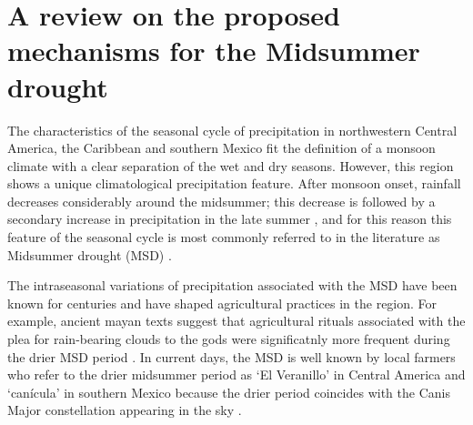 
\section{A review on the proposed mechanisms for the Midsummer drought}\label{sq:litmsd}


The characteristics of the seasonal cycle of precipitation in northwestern Central America, the Caribbean and southern Mexico fit the definition of a monsoon climate \citep{wang2017} with a clear separation of the wet and dry seasons. 
However, this region shows a unique climatological precipitation feature. After monsoon onset, rainfall decreases considerably around the midsummer; this decrease is followed by a secondary increase in precipitation in the late summer \citep{mosino1966}, and for this reason this feature of the seasonal cycle is most commonly referred to in the literature as Midsummer drought (MSD) \citep{magana1999}.   


The intraseasonal variations of precipitation associated with the MSD have been known for centuries and have shaped agricultural practices in the region. 
For example,  ancient mayan texts suggest that agricultural rituals associated with the plea for rain-bearing clouds to the gods were significatnly more frequent during the drier MSD period \citep{jobbova2018ritual}. In current days, the MSD is well known by local farmers who refer to the drier midsummer period as `El Veranillo' in Central America and `can\' icula' in southern Mexico because the drier period  coincides with the Canis Major constellation appearing in the sky \citep{dilley1996}.
%

